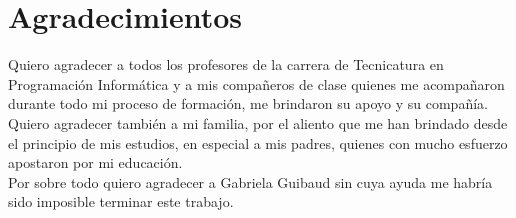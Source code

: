 \section*{Agradecimientos}
\jump[3]
\begin{raggedleft}
	
	Quiero agradecer a todos los profesores de la carrera de Tecnicatura en Programación
	Informática y a mis compañeros de clase quienes me acompañaron durante todo mi proceso
	de formación, me brindaron su apoyo y su compañía. \\
	\jump
	Quiero agradecer también a mi familia, por el aliento que me han brindado desde el
	principio de mis estudios, en especial a mis padres, quienes con mucho esfuerzo
	apostaron por mi educación.\\
	\jump
	Por sobre todo quiero agradecer a Gabriela Guibaud sin cuya ayuda me habría
	sido imposible terminar este trabajo.
	
\end{raggedleft}